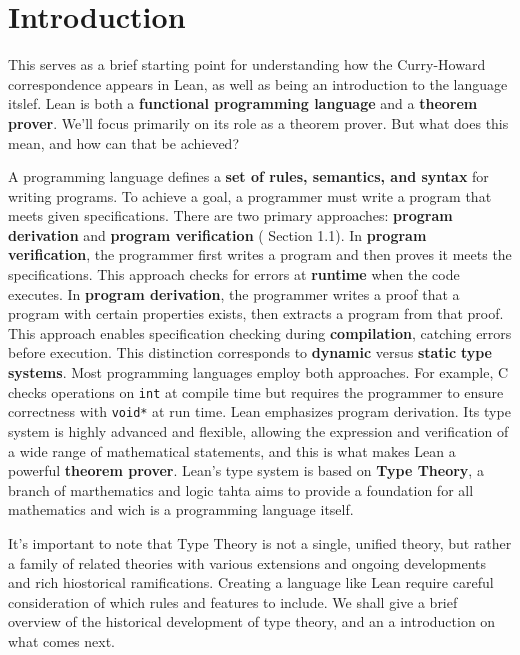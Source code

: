 \section{Introduction}
This serves as a brief starting point for understanding how the Curry-Howard correspondence appears in Lean, 
as well as being an introduction to the language itslef. 
Lean is both a \textbf{functional programming language} and a \textbf{theorem prover}.
We'll focus primarily on its role as a theorem prover. 
But what does this mean, and how can that be achieved?

A programming language defines a \textbf{set of rules, semantics, and syntax} for writing programs. 
To achieve a goal, a programmer must write a program that meets given specifications. 
There are two primary approaches: \textbf{program derivation} and \textbf{program verification} 
( \cite{nordstrom1990programming} Section 1.1).
In \textbf{program verification}, the programmer first writes a program and then proves it meets 
the specifications. This approach checks for errors at \textbf{runtime} when the code executes.
In \textbf{program derivation}, the programmer writes a proof that a program with certain properties exists, 
then extracts a program from that proof. This approach enables specification 
checking during \textbf{compilation}, catching errors before execution.
This distinction corresponds to \textbf{dynamic} versus \textbf{static} \textbf{type systems}. 
Most programming languages employ both approaches. For example, C checks operations on \texttt{int} 
at compile time but requires the programmer to ensure correctness with \texttt{void*} at run time.
Lean emphasizes program derivation.
Its type system is highly advanced and flexible, allowing the expression and verification 
of a wide range of mathematical statements, and this is what makes Lean a powerful \textbf{theorem prover}. 
Lean's type system is based on \textbf{Type Theory}, a branch of marthematics and logic tahta aims to provide a 
foundation for all mathematics and wich is a programming language itself.

It's important to note that Type Theory is not a single, unified theory, but rather a family of 
related theories with various extensions and ongoing developments and rich hiostorical ramifications. 
Creating a language like Lean require
careful consideration of which rules and features to include.
We shall give a brief overview of the historical development of type theory, and an a introduction on 
what comes next.

